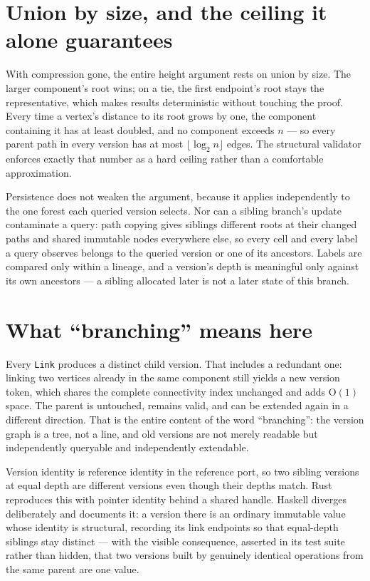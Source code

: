 \documentclass[11pt,twoside,openright]{book}
\newcommand{\code}[1]{\texorpdfstring{\textcolor{d7ink}{\texttt{#1}}}{#1}}
\newcommand{\bigoh}[1]{$\mathrm{O}(#1)$}
\begin{document}
\section{Union by size, and the ceiling it alone guarantees}

With compression gone, the entire height argument rests on union by size. The
larger component's root wins; on a tie, the first endpoint's root stays the
representative, which makes results deterministic without touching the proof.
Every time a vertex's distance to its root grows by one, the component
containing it has at least doubled, and no component exceeds $n$ --- so every
parent path in every version has at most $\lfloor \log_2 n \rfloor$ edges. The
structural validator enforces exactly that number as a hard ceiling rather than
a comfortable approximation.

Persistence does not weaken the argument, because it applies independently to
the one forest each queried version selects. Nor can a sibling branch's update
contaminate a query: path copying gives siblings different roots at their
changed paths and shared immutable nodes everywhere else, so every cell and
every label a query observes belongs to the queried version or one of its
ancestors. Labels are compared only within a lineage, and a version's depth is
meaningful only against its own ancestors --- a sibling allocated later is not a
later state of this branch.

\section{What ``branching'' means here}

Every \code{Link} produces a distinct child version. That includes a redundant
one: linking two vertices already in the same component still yields a new
version token, which shares the complete connectivity index unchanged and adds
\bigoh{1} space. The parent is untouched, remains valid, and can be extended
again in a different direction. That is the entire content of the word
``branching'': the version graph is a tree, not a line, and old versions are not
merely readable but independently queryable and independently extendable.

Version identity is reference identity in the reference port, so two sibling
versions at equal depth are different versions even though their depths match.
Rust reproduces this with pointer identity behind a shared handle. Haskell
diverges deliberately and documents it: a version there is an ordinary immutable
value whose identity is structural, recording its link endpoints so that equal-depth
siblings stay distinct --- with the visible consequence, asserted in its test
suite rather than hidden, that two versions built by genuinely identical
operations from the same parent are one value.
\end{document}

